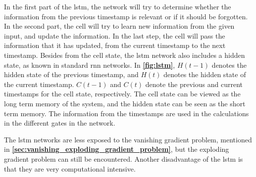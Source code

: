 In the first part of the \gls{lstm}, the network will try to determine whether the information from the previous timestamp is relevant or if it should be forgotten. In the second part, the cell will try to learn new information from the given input, and update the information. In the last step, the cell will pass the information that it has updated, from the current timestamp to the next timestamp. Besides from the cell state, the \gls{lstm} network also includes a hidden state, as known in standard \gls{rnn} networks. In \textbf{\autoref{fig:lstm}}, $H(t-1)$ denotes the hidden state of the previous timestamp, and $H(t)$ denotes the hidden state of the current timestamp. $C(t-1)$ and $C(t)$ denote the previous and current timestamps for the cell state, respectively. The cell state can be viewed as the long term memory of the system, and the hidden state can be seen as the short term memory. The information from the timestamps are used in the calculations in the different gates in the network.\cite{lstmVidhya}

The \gls{lstm} networks are less exposed to the vanishing gradient problem, mentioned in \textbf{\autoref{sec:vanishing_exploding_gradient_problem}}, but the exploding gradient problem can still be encountered. Another disadvantage of the \gls{lstm} is that they are very computational intensive.\cite{Yalcın2021}